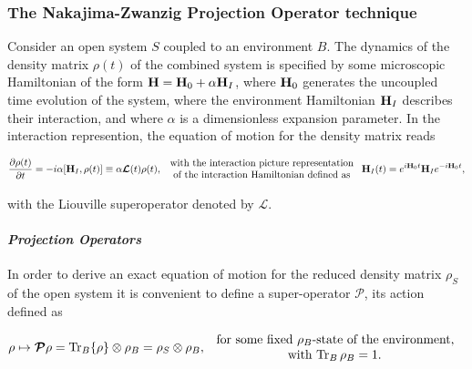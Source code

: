 \documentclass{homework}
\begin{document}
\subsubsection{\textbf{The Nakajima-Zwanzig Projection Operator technique}}

Consider an open system $S$ coupled to an environment $B$. The dynamics of the density matrix $\rho(t)$ of the combined system is specified by some microscopic Hamiltonian of the form ${\bf H} = {\bf H}_0 + \alpha {\bf H}_I$, where ${\bf H}_0$ generates the uncoupled time evolution of the system, where the environment Hamiltonian ${\bf H}_I$ describes their interaction, and where $\alpha$ is a dimensionless expansion parameter. In the interaction represention, the equation of motion for the density matrix reads 

\begin{equation}
    \frac{\partial \rho(t)}{\partial t} = - i \alpha [{\bf H}_I, \rho(t)] \equiv \alpha \bm{\mathcal{L}}(t) \rho(t),
    \begin{array}{c}
         \textnormal{ with the interaction picture representation }  \\
         \textnormal{ of the interaction Hamiltonian defined as } 
    \end{array}{\bf H}_I (t) = e^{i{\bf H}_0 t} {\bf H}_I e^{-i{\bf H}_0 t},
    \label{Proj_ev_Liouville}
\end{equation}

with the Liouville superoperator denoted by $\bm{\mathcal{L}}$. \\

\paragraph{\textit{Projection Operators}}

In order to derive an exact equation of motion for the reduced density matrix $\rho_S$ of the open system it is convenient to define a super-operator $\bm{\mathcal{P}}$, its action defined as 

\begin{equation}
    \rho \mapsto \bm{\mathcal{P}}\rho = \Tr_{B} \{\rho\} \otimes \rho_{B} = \rho_S \otimes \rho_B, \begin{array}{cc}
         \textnormal{ for some fixed $\rho_B$-state of the environment, }  \\
         \textnormal{ with $\Tr_{B} \rho_B = 1$. }
    \end{array}
\end{equation}
\end{document}
